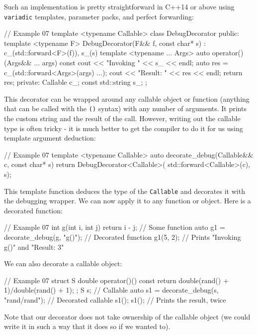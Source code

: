 Such an implementation is pretty straightforward in C++14 or above using \texttt{variadic} templates, parameter packs, and perfect forwarding:

\begin{code}
// Example 07
template <typename Callable> class DebugDecorator {
  public:
  template <typename F>
  DebugDecorator(F&& f, const char* s) :
    c_(std::forward<F>(f)), s_(s) {}
  template <typename ... Args>
  auto operator()(Args&& ... args) const {
    cout << "Invoking " << s_ << endl;
    auto res = c_(std::forward<Args>(args) ...);
    cout << "Result: " << res << endl;
    return res;
  }
  private:
  Callable c_;
  const std::string s_;
};
\end{code}

This decorator can be wrapped around any callable object or function (anything that can be called with the \texttt{()} syntax) with any number of arguments. It prints the custom string and the result of the call. However, writing out the callable type is often tricky - it is much better to get the compiler to do it for us using template argument deduction:

\begin{code}
// Example 07
template <typename Callable>
  auto decorate_debug(Callable&& c, const char* s) {
  return DebugDecorator<Callable>(
    std::forward<Callable>(c), s);
}
\end{code}

This template function deduces the type of the \texttt{Callable} and decorates it with the debugging wrapper. We can now apply it to any function or object. Here is a decorated function:

\begin{code}
// Example 07
int g(int i, int j) { return i - j; } // Some function
auto g1 = decorate_debug(g, "g()"); // Decorated function
g1(5, 2); // Prints "Invoking g()" and "Result: 3"
\end{code}

We can also decorate a callable object:

\begin{code}
// Example 07
struct S {
  double operator()() const {
    return double(rand() + 1)/double(rand() + 1);
  }
};
S s; // Callable
auto s1 =
  decorate_debug(s, "rand/rand"); // Decorated callable
s1(); s1(); // Prints the result, twice
\end{code}

Note that our decorator does not take ownership of the callable object (we could write it in such a way that it does so if we wanted to).


